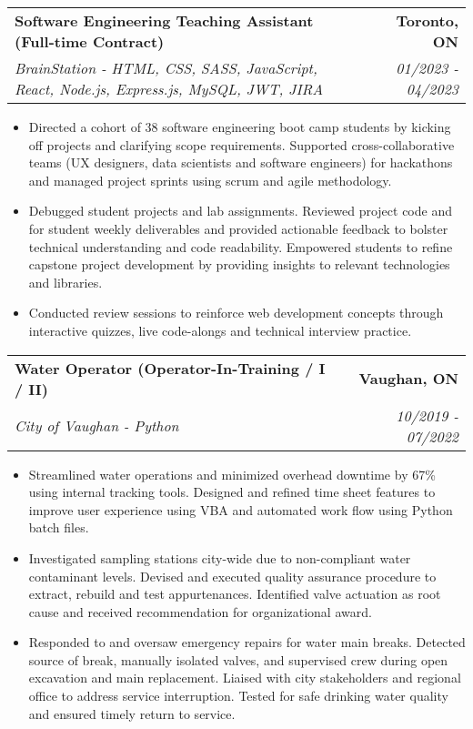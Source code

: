 \documentclass[letterpaper,11pt]{article}
\makeatletter
\newcommand{\resumeItem}[1]{
  \item\small{
    {#1 \vspace{-3pt}}
  }
}
\newcommand{\resumeSubheading}[4]{
  \vspace{-3pt}\item
    \begin{tabular*}{1.0\textwidth}[t]{l@{\extracolsep{\fill}}r}
      \textbf{#1} & \textbf{\small #2} \\
      \textit{\small#3} & \textit{\small #4} \\
    \end{tabular*}\vspace{-7pt}
}
\newcommand{\resumeItemListStart}{\begin{itemize}}
\newcommand{\resumeItemListEnd}{\end{itemize}\vspace{0pt}}
\makeatother
\begin{document}
        \resumeSubheading
        {Software Engineering Teaching Assistant (Full-time Contract)}{Toronto, ON}
            {BrainStation - HTML, CSS, SASS, JavaScript, React, Node.js, Express.js, MySQL, JWT, JIRA}{01/2023 - 04/2023}
            \resumeItemListStart
                \resumeItem{Directed a cohort of 38 software engineering boot camp students by kicking off projects and clarifying scope requirements. Supported cross-collaborative teams (UX designers, data scientists and software engineers) for hackathons and managed project sprints using scrum and agile methodology.}
                \resumeItem{Debugged student projects and lab assignments. Reviewed project code and for student weekly deliverables and provided actionable feedback to bolster technical understanding and code readability. Empowered students to refine capstone project development by providing insights to relevant technologies and libraries.}
                \resumeItem{Conducted review sessions to reinforce web development concepts through interactive quizzes, live code-alongs and technical interview practice.}
            \resumeItemListEnd

        \resumeSubheading
        {Water Operator (Operator-In-Training / I / II)}{Vaughan, ON}
            {City of Vaughan - Python}{10/2019 - 07/2022}
            \resumeItemListStart
                \resumeItem{Streamlined water operations and minimized overhead downtime by 67\% using internal tracking tools. Designed and refined time sheet features to improve user experience using VBA and automated work flow using Python batch files.}
                \resumeItem{Investigated sampling stations city-wide due to non-compliant water contaminant levels. Devised and executed quality assurance procedure to extract, rebuild and test appurtenances. Identified valve actuation as root cause and received recommendation for organizational award.}
                \resumeItem{Responded to and oversaw emergency repairs for water main breaks. Detected source of break, manually isolated valves, and supervised crew during open excavation and main replacement. Liaised with city stakeholders and regional office to address service interruption. Tested for safe drinking water quality and ensured timely return to service.}
            \resumeItemListEnd
\end{document}
